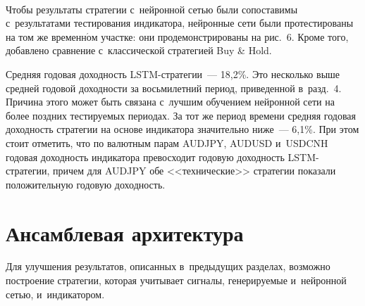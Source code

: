 {\begin{multicols}{2}
\begin{figure*} %
\vspace*{1pt}
  \begin{center}  
    \mbox{%
\epsfxsize=151.509mm
}

\end{center}
\vspace*{-6pt}
\end{figure*}
  
  Чтобы результаты стратегии с~нейронной сетью были сопоставимы с~результатами 
тестирования индикатора, нейронные сети были протестированы на том же временн$\acute{\mbox{о}}$м 
участке: они продемонстрированы на рис.~6. Кроме того, добавлено сравнение 
с~классической стратегией Buy \& Hold.
  
  Средняя годовая доходность LSTM-стра\-те\-гии~--- 18,2\%. Это несколько выше средней 
годовой доходности за восьмилетний период, приведенной в~разд.~4. Причина этого может 
быть связана с~лучшим обучением нейронной сети на более поздних тестируемых периодах. 
За тот же период времени средняя годовая доходность стратегии на основе индикатора 
значительно ниже~--- 6,1\%. При этом стоит отметить, что по валютным парам \mbox{AUDJPY}, 
AUDUSD и~USDCNH годовая доходность индикатора превосходит годовую доходность 
LSTM-стра\-те\-гии, причем для \mbox{AUDJPY} обе <<технические>> стратегии показали 
положительную годовую доходность. 


 \vspace*{-9pt}


\section{Ансамблевая архитектура}

 \vspace*{-2pt}

  Для улучшения результатов, описанных в~предыду\-щих разделах, возможно построение 
стратегии, которая учитывает сигналы, генерируемые и~нейронной сетью, и~индикатором. 





\end{multicols}}
